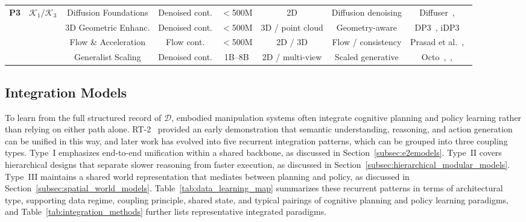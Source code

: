 \documentclass[acmsmall,screen,review]{acmart}
\begin{document}
\begin{table}[t!]
\begin{tabular}{
  l
  c
  c
  c
  c
  c
  c
  c
}
\midrule
\multirow{4}{*}{\textbf{P3}}
 & \multirow{4}{*}{$\mathcal{K}_1/\mathcal{K}_3$} & Diffusion Foundations & Denoised cont. & {$<$500M} & 2D & Diffusion denoising & Diffuser~\cite{janner2022diffuser},~\cite{chi2023diffusion} \\
 & & 3D Geometric Enhanc. & Denoised cont. & {$<$500M} & 3D / point cloud & Geometry-aware & DP3~\cite{ze2024diffusion}, iDP3~\cite{liang2024idp3} \\
 & & Flow \& Acceleration & Flow cont. & {$<$500M} & 2D / 3D & Flow / consistency & Prasad et al.~\cite{prasad2024consistency},~\cite{xue2025recflow} \\
 & & Generalist Scaling & Denoised cont. & {1B--8B} & 2D / multi-view & Scaled generative & Octo~\cite{octomodelteam2024},~\cite{liu2025rdtb},~\cite{reuss2025flower} \\
\bottomrule
\end{tabular}
\end{table}

\subsection{Integration Models}\label{sec:integration_models}

To learn from the full structured record of \(\mathcal{D}\), embodied manipulation systems often integrate cognitive planning and policy learning rather than relying on either path alone.
RT-2~\cite{brohan2023rt2} provided an early demonstration that semantic understanding, reasoning, and action generation can be unified in this way, and later work has evolved into five recurrent integration patterns, which can be grouped into three coupling types.
Type~I emphasizes end-to-end unification within a shared backbone, as discussed in Section~\ref{subsec:e2emodels}.
Type~II covers hierarchical designs that separate slower reasoning from faster execution, as discussed in Section~\ref{subsec:hierarchical_modular_models}.
Type~III maintains a shared world representation that mediates between planning and policy, as discussed in Section~\ref{subsec:spatial_world_models}.
Table~\ref{tab:data_learning_map} summarizes these recurrent patterns in terms of architectural type, supporting data regime, coupling principle, shared state, and typical pairings of cognitive planning and policy learning paradigms, and Table~\ref{tab:integration_methods} further lists representative integrated paradigms.
\end{document}
